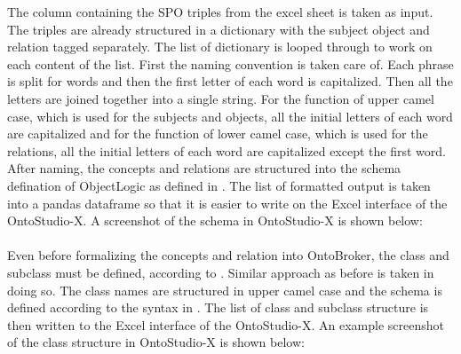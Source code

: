 The column containing the SPO triples from the excel sheet is taken as input. The triples are already structured in a dictionary with the subject object and relation tagged separately. The list of dictionary is looped through to work on each content of the list. First the naming convention is taken care of. Each phrase is split for words and then the first letter of each word is capitalized. Then all the letters are joined together into a single string. For the function of upper camel case, which is used for the subjects and objects, all the initial letters of each word are capitalized and for the function of lower camel case, which is used for the relations, all the initial letters of each word are capitalized except the first word. After naming, the concepts and relations are structured into the schema defination of ObjectLogic as defined in \cite{obl}. The list of formatted output is taken into a pandas dataframe so that it is easier to write on the Excel interface of the OntoStudio-X. A screenshot of the schema in OntoStudio-X is shown below:


\bigskip\bigskip {}

\paragraph{}Even before formalizing the concepts and relation into OntoBroker, the class and subclass must be defined, according to \cite{Luo2016}. Similar approach as before is taken in doing so. The class names are structured in upper camel case and the schema is defined according to the syntax in \cite{obl}. The list of class and subclass structure is then written to the Excel interface of the OntoStudio-X. An example screenshot of the class structure in OntoStudio-X is shown below:


\bigskip\bigskip {}